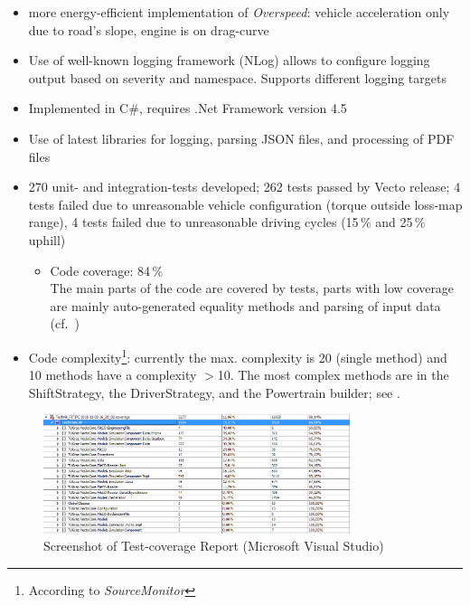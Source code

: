 \begin{itemize}
	\item more energy-efficient implementation of \textit{Overspeed}: vehicle acceleration only due to road's slope, engine is on drag-curve
	\item Use of well-known logging framework (NLog) allows to configure logging output based on severity and namespace. Supports different logging targets
	\item Implemented in C\#, requires .Net Framework version 4.5
	\item Use of latest libraries for logging, parsing JSON files, and processing of PDF files
	\item 270 unit- and integration-tests developed; 262 tests passed by Vecto release; 4 tests failed due to unreasonable vehicle configuration (torque outside loss-map range), 4 tests failed due to unreasonable driving cycles (15\,\% and 25\,\% uphill)
	\begin{itemize}
		\item Code coverage: 84\,\% \\
		The main parts of the code are covered by tests, parts with low coverage are mainly auto-generated equality methods and parsing of input data (cf.~)
	\end{itemize}
	\item Code complexity\footnote{According to \textit{SourceMonitor}}: currently the max. complexity is 20 (single method) and 10 methods have a complexity $>$10. The most complex methods are in the ShiftStrategy, the DriverStrategy, and the Powertrain builder; see .%
\end{itemize}

\begin{figure}
	\centering
	\includegraphics[width=0.8\textwidth]{img/Vecto3_0_1_TestCoverage.png}
	\caption{Screenshot of Test-coverage Report (Microsoft Visual Studio)}
	\label{fig:Vecto301_TestCoverage}
\end{figure}

